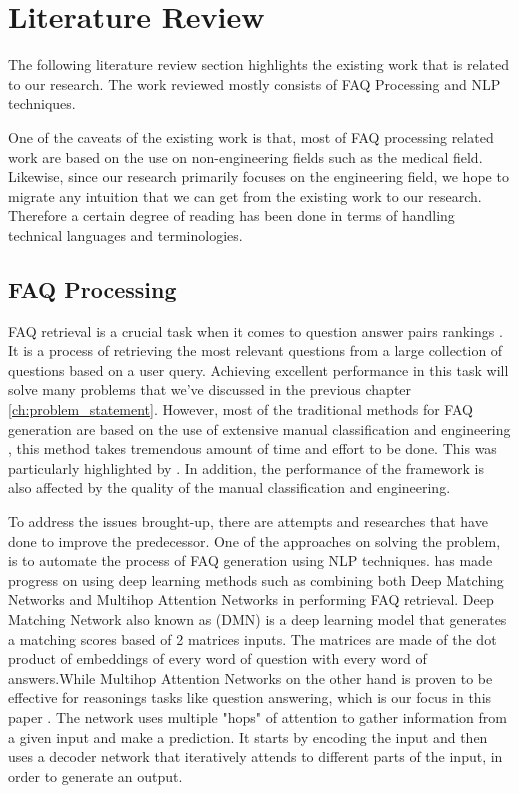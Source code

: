 \chapter{Literature Review}
The following literature review section highlights the existing work that is related to our research. The work reviewed mostly consists of FAQ Processing and NLP techniques.

One of the caveats of the existing work is that, most of FAQ processing related work are based on the use on non-engineering fields such as the medical field. Likewise, since our research primarily focuses on the engineering field, we hope to migrate any intuition that we can get from the existing work to our research. Therefore a certain degree of reading has been done in terms of handling technical languages and terminologies.

\pagebreak
\section{FAQ Processing}
FAQ retrieval is a crucial task when it comes to question answer pairs rankings \cite{faq_gen_1}. It is a process of retrieving the most relevant questions from a large collection of questions based on a user query. Achieving excellent performance in this task will solve many problems that we've discussed in the previous chapter \ref*{ch:problem_statement}. However, most of the traditional methods for FAQ generation are based on the use of extensive manual classification and engineering \cite{faq_gen_1}, this method takes tremendous amount of time and effort to be done. This was particularly highlighted by \cite{10.1007/978-3-319-18356-5_30} \cite{5615722} \cite{6227139} \cite{7817112}. In addition, the performance of the framework is also affected by the quality of the manual classification and engineering.

To address the issues brought-up, there are attempts and researches that have done to improve the predecessor. One of the approaches on solving the problem, is to automate the process of FAQ generation using NLP techniques. \cite{faq_gen_1} has made progress on using deep learning methods such as combining both Deep Matching Networks and Multihop Attention Networks in performing FAQ retrieval. Deep Matching Network also known as (DMN) is a deep learning model that generates a matching scores based of 2 matrices inputs. The matrices are made of the dot product of embeddings of every word of question with every word of answers.While Multihop Attention Networks on the other hand is proven to be effective for reasonings tasks like question answering, which is our focus in this paper \cite{faq_gen_1}. The network uses multiple "hops" of attention to gather information from a given input and make a prediction. It starts by encoding the input and then uses a decoder network that iteratively attends to different parts of the input, in order to generate an output.

